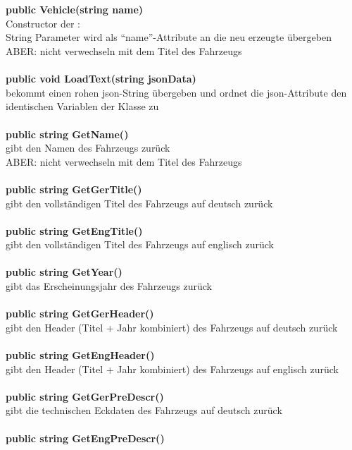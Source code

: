 \section{\vhc}
\label{sec:vhmeth}
%
\textbf{public Vehicle(string name)}\\
Constructor der \vhc:\\
String Parameter wird als \enquote{name}-Attribute an die neu erzeugte \vhi übergeben\\
ABER: nicht verwechseln mit dem Titel des Fahrzeugs\\
\\
\textbf{public void LoadText(string jsonData)}\\
bekommt einen rohen json-String übergeben und ordnet die json-Attribute den identischen Variablen der Klasse zu\\
\\
\textbf{public string GetName()}\\
gibt den Namen des Fahrzeugs zurück\\
ABER: nicht verwechseln mit dem Titel des Fahrzeugs\\
\\
\textbf{public string GetGerTitle()}\\
gibt den vollständigen Titel des Fahrzeugs auf deutsch zurück\\
\\
\textbf{public string GetEngTitle()}\\
gibt den vollständigen Titel des Fahrzeugs auf englisch zurück\\
\\
\textbf{public string GetYear()}\\
gibt das Erscheinungsjahr des Fahrzeugs zurück\\
\\
\textbf{public string GetGerHeader()}\\
gibt den Header (Titel + Jahr kombiniert) des Fahrzeugs auf deutsch zurück\\
\\
\textbf{public string GetEngHeader()}\\
gibt den Header (Titel + Jahr kombiniert) des Fahrzeugs auf englisch zurück\\
\\
\textbf{public string GetGerPreDescr()}\\
gibt die technischen Eckdaten des Fahrzeugs auf deutsch zurück\\
\\
\textbf{public string GetEngPreDescr()}\\
